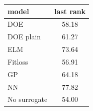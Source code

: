 \begin{tabular}{|lc|}
\hline
model & last rank\\
\hline
DOE & 58.18 \\
DOE plain & 61.27 \\
ELM & 73.64 \\
Fitloss & 56.91 \\
GP & 64.18 \\
NN & 77.82 \\
No surrogate & 54.00 \\
\hline
\end{tabular}
